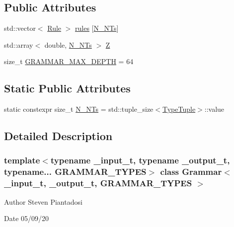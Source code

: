 \subsection*{Public Attributes}
\begin{DoxyCompactItemize}
\item 
std\+::vector$<$ \hyperlink{class_rule}{Rule} $>$ \hyperlink{class_grammar_a06752487e61dd790df43b530044702fd}{rules} \mbox{[}\hyperlink{class_grammar_a845af53585cb7b104458b4f4b6da114f}{N\+\_\+\+N\+Ts}\mbox{]}
\item 
std\+::array$<$ double, \hyperlink{class_grammar_a845af53585cb7b104458b4f4b6da114f}{N\+\_\+\+N\+Ts} $>$ \hyperlink{class_grammar_a7cf38380ce1e0ea85706673859693d71}{Z}
\item 
size\+\_\+t \hyperlink{class_grammar_a87c7974198d014c9fd324fbfd39b62e6}{G\+R\+A\+M\+M\+A\+R\+\_\+\+M\+A\+X\+\_\+\+D\+E\+P\+TH} = 64
\end{DoxyCompactItemize}
\subsection*{Static Public Attributes}
\begin{DoxyCompactItemize}
\item 
static constexpr size\+\_\+t \hyperlink{class_grammar_a845af53585cb7b104458b4f4b6da114f}{N\+\_\+\+N\+Ts} = std\+::tuple\+\_\+size$<$\hyperlink{class_grammar_abfb390f3654ce837c97c8b3d0d3b5f0f}{Type\+Tuple}$>$\+::value
\end{DoxyCompactItemize}


\subsection{Detailed Description}
\subsubsection*{template$<$typename \+\_\+input\+\_\+t, typename \+\_\+output\+\_\+t, typename... G\+R\+A\+M\+M\+A\+R\+\_\+\+T\+Y\+P\+ES$>$\newline
class Grammar$<$ \+\_\+input\+\_\+t, \+\_\+output\+\_\+t, G\+R\+A\+M\+M\+A\+R\+\_\+\+T\+Y\+P\+E\+S $>$}

\begin{DoxyAuthor}{Author}
Steven Piantadosi 
\end{DoxyAuthor}
\begin{DoxyDate}{Date}
05/09/20 
\end{DoxyDate}


